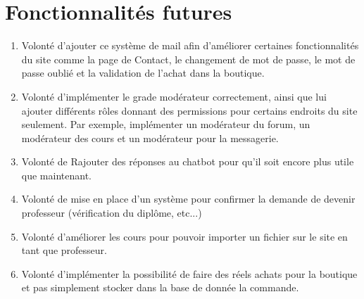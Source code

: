 \documentclass[12pt,a4paper]{article}
\begin{document}
\section{Fonctionnalités futures}
\begin{enumerate}
    \item Volonté d'ajouter ce système de mail afin d'améliorer certaines fonctionnalités du site comme la page de Contact, le changement de mot de passe, le mot de passe oublié et la validation de l'achat dans la boutique.
    \item Volonté d'implémenter le grade modérateur correctement, ainsi que lui ajouter différents rôles donnant des permissions pour certains endroits du site seulement. Par exemple, implémenter un modérateur du forum, un modérateur des cours et un modérateur pour la messagerie.
    \item Volonté de Rajouter des réponses au chatbot pour qu'il soit encore plus utile que maintenant.
    \item Volonté de mise en place d'un système pour confirmer la demande de devenir professeur (vérification du diplôme, etc...)
    \item Volonté d'améliorer les cours pour pouvoir importer un fichier sur le site en tant que professeur.
    \item Volonté d'implémenter la possibilité de faire des réels achats pour la boutique et pas simplement stocker dans la base de donnée la commande.
\end{enumerate}

\newpage
\end{document}
